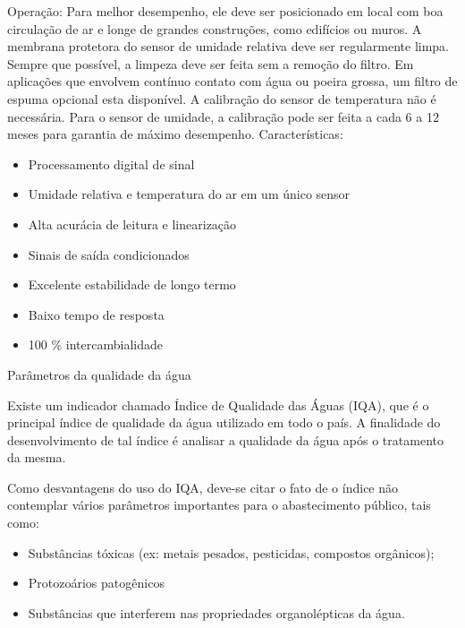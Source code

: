 \documentclass[12pt,openright,oneside,a4paper,brazil]{abntex2}
\begin{document}
Operação: Para melhor desempenho, ele deve ser posicionado em local com boa circulação de ar e longe de grandes construções, como  edifícios ou muros. A membrana protetora do sensor de umidade relativa deve ser regularmente limpa. Sempre que possível, a limpeza deve ser feita sem a remoção do filtro. Em aplicações que envolvem contínuo contato com água ou poeira grossa, um filtro de espuma  opcional esta disponível. A calibração do sensor de temperatura não é necessária. Para o sensor de umidade, a calibração pode ser feita a cada 6 a 12 meses para garantia de máximo desempenho.
 Características:
 \begin{itemize}
\item Processamento digital de sinal
\item Umidade relativa e temperatura do ar em um único sensor
\item Alta acurácia de leitura e linearização
\item Sinais de saída condicionados
\item Excelente estabilidade de longo termo
\item Baixo tempo de resposta
\item 100 \% intercambialidade
 \end{itemize}
 \newpage
\begin{center}
 {\large Parâmetros da qualidade da água}\\
 \end{center}
Existe um indicador chamado Índice de Qualidade das Águas (IQA), que é o principal índice de qualidade da água utilizado em todo o país. A finalidade do desenvolvimento de tal índice é analisar a qualidade da água após o tratamento da mesma.

Como desvantagens do uso do IQA, deve-se citar o fato de o índice não contemplar vários parâmetros importantes para o abastecimento público, tais como:
\begin{itemize}
\item Substâncias tóxicas (ex: metais pesados, pesticidas, compostos orgânicos);
\item Protozoários patogênicos
\item Substâncias que interferem nas propriedades organolépticas da água.

\end{itemize}
\end{document}
